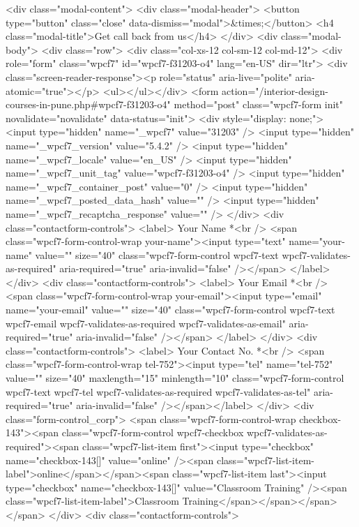 {{{{{{{<div class="modal-content">
<div class="modal-header">
<button type="button" class="close" data-dismiss="modal">&times;</button>
<h4 class="modal-title">Get call back from us</h4>
</div>
<div class="modal-body">
<div class="row">
<div class="col-xs-12 col-sm-12 col-md-12">
<div role="form" class="wpcf7" id="wpcf7-f31203-o4" lang="en-US" dir="ltr">
<div class="screen-reader-response"><p role="status" aria-live="polite" aria-atomic="true"></p> <ul></ul></div>
<form action="/interior-design-courses-in-pune.php#wpcf7-f31203-o4" method="post" class="wpcf7-form init" novalidate="novalidate" data-status="init">
<div style="display: none;">
<input type="hidden" name="_wpcf7" value="31203" />
<input type="hidden" name="_wpcf7_version" value="5.4.2" />
<input type="hidden" name="_wpcf7_locale" value="en_US" />
<input type="hidden" name="_wpcf7_unit_tag" value="wpcf7-f31203-o4" />
<input type="hidden" name="_wpcf7_container_post" value="0" />
<input type="hidden" name="_wpcf7_posted_data_hash" value="" />
<input type="hidden" name="_wpcf7_recaptcha_response" value="" />
</div>
<div class="contactform-controls">
<label> Your Name *<br />
<span class="wpcf7-form-control-wrap your-name"><input type="text" name="your-name" value="" size="40" class="wpcf7-form-control wpcf7-text wpcf7-validates-as-required" aria-required="true" aria-invalid="false" /></span> </label>
</div>
<div class="contactform-controls">
<label> Your Email *<br />
<span class="wpcf7-form-control-wrap your-email"><input type="email" name="your-email" value="" size="40" class="wpcf7-form-control wpcf7-text wpcf7-email wpcf7-validates-as-required wpcf7-validates-as-email" aria-required="true" aria-invalid="false" /></span> </label>
</div>
<div class="contactform-controls">
<label> Your Contact No. *<br />
<span class="wpcf7-form-control-wrap tel-752"><input type="tel" name="tel-752" value="" size="40" maxlength="15" minlength="10" class="wpcf7-form-control wpcf7-text wpcf7-tel wpcf7-validates-as-required wpcf7-validates-as-tel" aria-required="true" aria-invalid="false" /></span></label>
</div>
<div class="form-control_corp">
<span class="wpcf7-form-control-wrap checkbox-143"><span class="wpcf7-form-control wpcf7-checkbox wpcf7-validates-as-required"><span class="wpcf7-list-item first"><input type="checkbox" name="checkbox-143[]" value="online" /><span class="wpcf7-list-item-label">online</span></span><span class="wpcf7-list-item last"><input type="checkbox" name="checkbox-143[]" value="Classroom Training" /><span class="wpcf7-list-item-label">Classroom Training</span></span></span></span>
</div>
<div class="contactform-controls">
}}}}}}}
